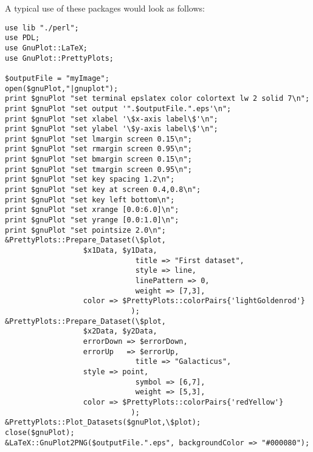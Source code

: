 A typical use of these packages would look as follows:
\begin{verbatim}
use lib "./perl";
use PDL;
use GnuPlot::LaTeX;
use GnuPlot::PrettyPlots;

$outputFile = "myImage";
open($gnuPlot,"|gnuplot");
print $gnuPlot "set terminal epslatex color colortext lw 2 solid 7\n";
print $gnuPlot "set output '".$outputFile.".eps'\n";
print $gnuPlot "set xlabel '\$x-axis label\$'\n";
print $gnuPlot "set ylabel '\$y-axis label\$'\n";
print $gnuPlot "set lmargin screen 0.15\n";
print $gnuPlot "set rmargin screen 0.95\n";
print $gnuPlot "set bmargin screen 0.15\n";
print $gnuPlot "set tmargin screen 0.95\n";
print $gnuPlot "set key spacing 1.2\n";
print $gnuPlot "set key at screen 0.4,0.8\n";
print $gnuPlot "set key left bottom\n";
print $gnuPlot "set xrange [0.0:6.0]\n";
print $gnuPlot "set yrange [0.0:1.0]\n";
print $gnuPlot "set pointsize 2.0\n";
&PrettyPlots::Prepare_Dataset(\$plot,
			      $x1Data, $y1Data,
                              title => "First dataset",
                              style => line,
                              linePattern => 0,
                              weight => [7,3],
			      color => $PrettyPlots::colorPairs{'lightGoldenrod'}
                             );
&PrettyPlots::Prepare_Dataset(\$plot,
			      $x2Data, $y2Data,
			      errorDown => $errorDown,
			      errorUp   => $errorUp,
                              title => "Galacticus",
			      style => point,
                              symbol => [6,7],
                              weight => [5,3],
			      color => $PrettyPlots::colorPairs{'redYellow'}
                             );
&PrettyPlots::Plot_Datasets($gnuPlot,\$plot);
close($gnuPlot);
&LaTeX::GnuPlot2PNG($outputFile.".eps", backgroundColor => "#000080");
\end{verbatim}

